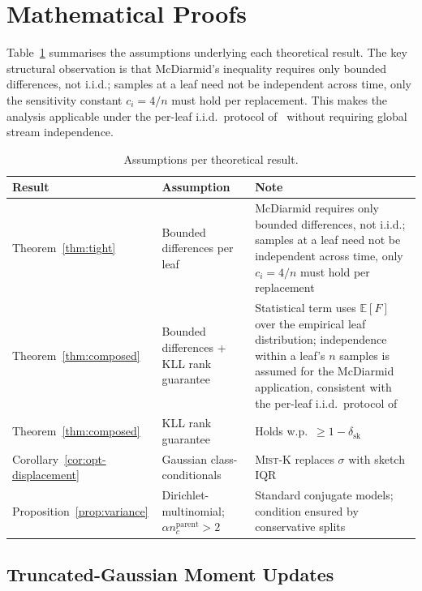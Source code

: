 \documentclass{article}
\newcommand{\mist}{\textsc{Mist}}
\begin{document}
\section{Mathematical Proofs}
\label{app:proofs}

Table~\ref{tab:assumptions} summarises the assumptions underlying each
theoretical result. The key structural observation is that McDiarmid's
inequality requires only bounded differences, not i.i.d.; samples at a
leaf need not be independent across time, only the sensitivity constant
$c_i = 4/n$ must hold per replacement. This makes the analysis applicable
under the per-leaf i.i.d.\ protocol of~\cite{DomingosHulten2000} without requiring
global stream independence.

\begin{table}[h]
\centering
\caption{Assumptions per theoretical result.}
\label{tab:assumptions}
\begin{tabular}{llp{5cm}}
\toprule
Result & Assumption & Note \\
\midrule
Theorem~\ref{thm:tight}
  & Bounded differences per leaf
  & McDiarmid requires only bounded differences, not i.i.d.; samples at a
    leaf need not be independent across time, only $c_i = 4/n$ must hold per
    replacement \\
Theorem~\ref{thm:composed}
  & Bounded differences + KLL rank guarantee
  & Statistical term uses $\mathbb{E}[F]$ over the empirical leaf distribution;
    independence within a leaf's $n$ samples is assumed for the McDiarmid
    application, consistent with the per-leaf i.i.d.\ protocol
    of~\cite{DomingosHulten2000} \\
Theorem~\ref{thm:composed}
  & KLL rank guarantee
  & Holds w.p.\ $\geq 1-\delta_{\mathrm{sk}}$ \\
Corollary~\ref{cor:opt-displacement}
  & Gaussian class-conditionals
  & \mist{}-K replaces $\sigma$ with sketch IQR \\
Proposition~\ref{prop:variance}
  & Dirichlet-multinomial; $\alpha n_c^{\mathrm{parent}} > 2$
  & Standard conjugate models; condition ensured by conservative splits \\
\bottomrule
\end{tabular}
\end{table}

\subsection{Truncated-Gaussian Moment Updates}
\label{app:truncgauss}
\end{document}
